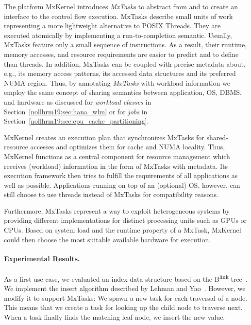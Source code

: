 \documentclass[11pt]{article}
\begin{document}
The platform MxKernel introduces \emph{MxTasks} to abstract from and to create an interface to the control flow execution.
MxTasks describe small units of work representing a more lightweight alternative to POSIX Threads.
They are executed atomically by implementing a run-to-completion semantic.
Usually, MxTasks feature only a small sequence of instructions.
As a result, their runtime, memory accesses, and resource requirements are easier to predict and to define than threads.
In addition, MxTasks can be coupled with precise metadata about, e.g., its memory access patterns, its accessed data structures and its preferred NUMA region.
Thus, by annotating \emph{MxTasks} with workload information we employ the same concept of sharing semantics between application, OS, DBMS, and hardware as discussed for \emph{workload classes} in Section~\ref{nollhrm19:sec:hana_wlm} or for \emph{jobs} in Section~\ref{nollhrm19:sec:cpu_cache_partitioning}.

MxKernel creates an execution plan that synchronizes MxTasks for shared-resource accesses and optimizes them for cache and NUMA locality.
Thus, MxKernel functions as a central component for resource management which receives (workload) information in the form of MxTasks with metadata.
Its execution framework then tries to fulfill the requirements of all applications as well as possible.
Applications running on top of an (optional) OS, however, can still choose to use threads instead of MxTasks for compatibility reasons.

Furthermore, MxTasks represent a way to exploit heterogeneous systems by providing different implementations for distinct processing units such as GPUs or CPUs.
Based on system load and the runtime property of a MxTask, MxKernel could then choose the most suitable available hardware for execution.

\paragraph*{Experimental Results.}
As a first use case, we evaluated an index data structure based on the B\textsuperscript{link}-tree~\cite{nollhrm19:Lehman:1981:ELC:319628.319663}.
We implement the insert algorithm described by Lehman and Yao~\cite{nollhrm19:Lehman:1981:ELC:319628.319663}.
However, we modify it to support MxTasks: We spawn a new task for each traversal of a node.
This means that we create a task for looking up the child node to traverse next.
When a task finally finds the matching leaf node, we insert the new value.
\end{document}
